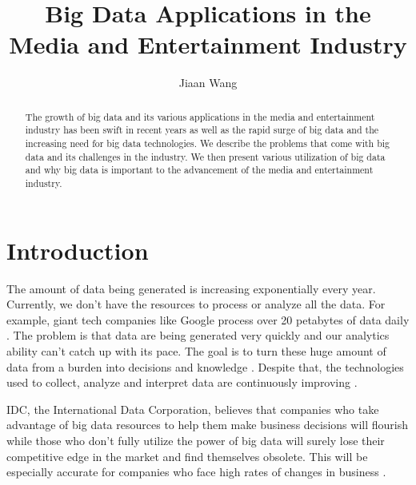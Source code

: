 \title{Big Data Applications in the Media and Entertainment Industry}


\author{Jiaan Wang}


\begin{abstract}

    The growth of big data and its various applications in the media and entertainment 
    industry has been swift in recent years as well as the rapid surge of big data 
    and the increasing need for big data technologies. We describe the problems 
    that come with big data and its challenges in the industry. We then present 
    various utilization of big data and why big data is important to the advancement 
    of the media and entertainment industry. 
    
\end{abstract}


\maketitle

\section{Introduction}

The amount of data being generated is increasing exponentially every year. Currently, we don't have the resources to process or analyze all the data. For example, giant tech companies like Google process over 20 petabytes of data daily \cite{Schlieski2012data}. The problem is that data are being generated very quickly and our analytics ability can't catch up with its pace. The goal is to turn these huge amount of data from a burden into decisions and knowledge \cite{Browning2015laptop}. Despite that, the technologies used to collect, analyze and interpret data are continuously improving \cite{Schlieski2012data}.

IDC, the International Data Corporation, believes that companies who take advantage of big data resources to help them make business decisions will flourish while those who don't fully utilize the power of big data will surely lose their competitive edge in the market and find themselves obsolete. This will be especially accurate for companies who face high rates of changes in business \cite{Villars2011care}.


